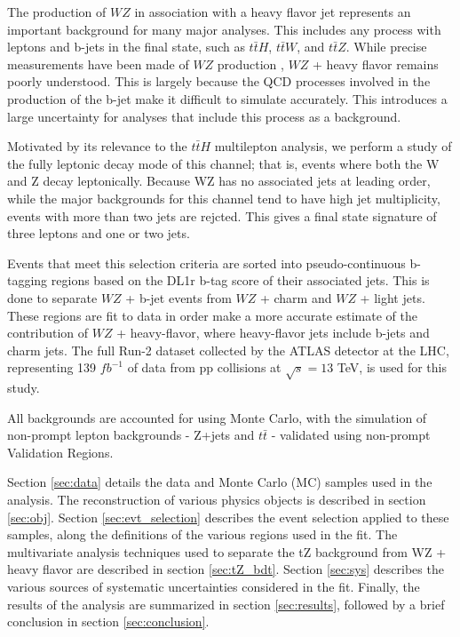 
The production of $WZ$ in association with a heavy flavor jet represents an important background for many major analyses. This includes any process with leptons and b-jets in the final state, such as $t\bar{t}H$, $t\bar{t}W$, and $t\bar{t}Z$. While precise measurements have been made of $WZ$ production \cite{WZ_36}, $WZ$ + heavy flavor remains poorly understood. This is largely because the QCD processes involved in the production of the b-jet make it difficult to simulate accurately. This introduces a large uncertainty for analyses that include this process as a background.

Motivated by its relevance to the $t\bar{t}H$ multilepton analysis, we perform a study of the fully leptonic decay mode of this channel; that is, events where both the W and Z decay leptonically. Because WZ has no associated jets at leading order, while the major backgrounds for this channel tend to have high jet multiplicity, events with more than two jets are rejcted. This gives a final state signature of three leptons and one or two jets.

Events that meet this selection criteria are sorted into pseudo-continuous b-tagging regions based on the DL1r b-tag score of their associated jets. This is done to separate $WZ$ + b-jet events from $WZ$ + charm and $WZ$ + light jets. These regions are fit to data in order make a more accurate estimate of the contribution of $WZ$ + heavy-flavor, where heavy-flavor jets include b-jets and charm jets. The full Run-2 dataset collected by the ATLAS detector at the LHC, representing 139 $fb^{-1}$ of data from pp collisions at $\sqrt{s} = 13$ TeV, is used for this study.

All backgrounds are accounted for using Monte Carlo, with the simulation of non-prompt lepton backgrounds - Z+jets and $t\bar{t}$ - validated using non-prompt Validation Regions.

Section \ref{sec:data} details the data and Monte Carlo (MC) samples used in the analysis. The reconstruction of various physics objects is described in section \ref{sec:obj}. Section \ref{sec:evt_selection} describes the event selection applied to these samples, along the definitions of the various regions used in the fit. The multivariate analysis techniques used to separate the tZ background from WZ + heavy flavor are described in section \ref{sec:tZ_bdt}. Section \ref{sec:sys} describes the various sources of systematic uncertainties considered in the fit. Finally, the results of the analysis are summarized in section \ref{sec:results}, followed by a brief conclusion in section \ref{sec:conclusion}.

